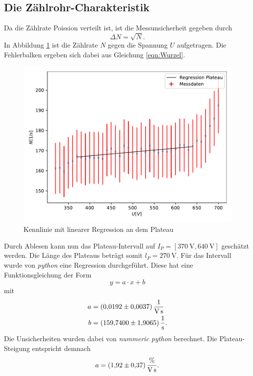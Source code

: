 \subsection{Die Zählrohr-Charakteristik}
\label{subsec:Charakteristik}
Da die Zählrate Poission verteilt ist, ist die Messunsicherheit gegeben durch 
\begin{equation}
    \Delta N=\sqrt{N}. \label{eqn:Wurzel}
\end{equation}
In Abbildung \ref{fig:Kennlinie} ist die Zählrate $N$ gegen die Spannung $U$ aufgetragen. Die Fehlerbalken
ergeben sich dabei aus Gleichung \ref{eqn:Wurzel}.
\begin{figure}[H]
    \centering
    \includegraphics[scale=0.8]{auswertung/plot1.pdf}
    \caption{Kennlinie mit linearer Regression an dem Plateau}
    \label{fig:Kennlinie}
  \end{figure}
  \noindent Durch Ablesen kann nun das Plateau-Intervall auf $I_{P}=[\SI{370}{\volt}, \SI{640}{\volt}]$ geschätzt werden.
  Die Länge des Plateaus beträgt somit $l_{P}=\SI{270}{\volt}$. Für das Intervall 
  wurde von \textit{python} eine Regression durchgeführt. Diese hat eine Funktionsgleichung der Form
  \begin{equation}
      y=a\cdot x+b \label{eqn:gerade}
  \end{equation} 
  mit
  \begin{align*}
    a &= \SI{0.0192 \pm 0.0037}{\per\volt\per\second}\\
    b &= \SI{159.74 \pm 1.9065}{\per\second}.
  \end{align*}
  Die Unsicherheiten wurden dabei von  \textit{nummeric python} berechnet.
  Die Plateau-Steigung entspricht demnach
  \begin{equation*}
    a = \SI{1.92 \pm 0.37}{\percent\per\volt\per\second}.
  \end{equation*}


